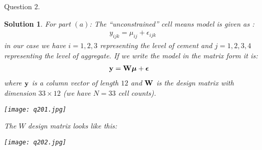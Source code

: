 \documentclass[11pt]{article}
\newtheorem{sol}{Solution}
\begin{document}
Question $2$.
\begin{sol}
	For part $(a)$:\vskip 2mm
	The ``unconstrained'' cell means model is given as :
	\begin{align*}
		y_{ijk} = \mu_{ij} + \epsilon_{ijk}
	\end{align*}
	in our case we have $i = 1, 2, 3$ representing the level of cement and $j = 1, 2, 3, 4$ representing the level of aggregate.\vskip 2mm
	If we write the model in the matrix form it is:
	\begin{align*}
		{\bf y} &= {\bf W}{\bm \mu} + {\bm \epsilon}
	\end{align*}
	where ${\bf y}$ is a column vector of length $12$ and ${\bf W}$ is the design matrix with dimension $33 \times 12$ (we have $N = 33$ cell counts).\vskip 2mm
	\begin{center}
		\texttt{[image: q201.jpg]}
	\end{center}
	The $W$ design matrix looks like this:
	\begin{center}
		\texttt{[image: q202.jpg]}
	\end{center}
	

\end{sol}
\end{document}
